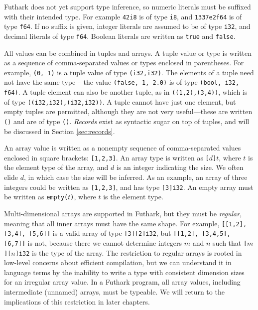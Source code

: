 \documentclass[oneside,11pt]{book}
\begin{document}
Futhark does not yet support type inference, so numeric literals must
be suffixed with their intended type.  For example \texttt{42i8} is of
type \texttt{i8}, and \texttt{1337e2f64} is of type \texttt{f64}.  If
no suffix is given, integer literals are assumed to be of type
\texttt{i32}, and decimal literals of type \texttt{f64}.  Boolean
literals are written as \texttt{true} and \texttt{false}.

All values can be combined in tuples and arrays.  A tuple value or
type is written as a sequence of comma-separated values or types
enclosed in parentheses.  For example, \texttt{(0, 1)} is a tuple
value of type \texttt{(i32,i32)}.  The elements of a tuple need not
have the same type -- the value \texttt{(false, 1, 2.0)} is of type
\texttt{(bool, i32, f64)}.  A tuple element can also be another tuple,
as in \texttt{((1,2),(3,4))}, which is of type
\texttt{((i32,i32),(i32,i32))}.  A tuple cannot have just one element,
but empty tuples are permitted, although they are not very
useful---these are written \texttt{()} and are of type \texttt{()}.
\textit{Records} exist as syntactic sugar on top of tuples, and will
be discussed in Section \ref{sec:records}.

An array value is written as a nonempty sequence of comma-separated
values enclosed in square brackets: \texttt{[1,2,3]}.  An array type
is written as \texttt{[$d$]$t$}, where \texttt{$t$} is the element
type of the array, and $d$ is an integer indicating the size.  We
often elide $d$, in which case the size will be inferred.  As an
example, an array of three integers could be written as
\texttt{[1,2,3]}, and has type \texttt{[3]i32}.  An empty array must be
written as \texttt{empty($t$)}, where \texttt{$t$} is the element
type.

Multi-dimensional arrays are supported in Futhark, but they must be
\textit{regular}, meaning that all inner arrays must have the same
shape.  For example, \texttt{[[1,2], [3,4], [5,6]]} is a valid array
of type \texttt{[3][2]i32}, but \texttt{[[1,2], [3,4,5], [6,7]]} is
not, because there we cannot determine integers $m$ and $n$ such that
\texttt{[$m$][$n$]i32} is the type of the array.  The restriction to
regular arrays is rooted in low-level concerns about efficient
compilation, but we can understand it in language terms by the
inability to write a type with consistent dimension sizes for an
irregular array value.  In a Futhark program, all array values,
including intermediate (unnamed) arrays, must be typeable.  We will
return to the implications of this restriction in later chapters.
\end{document}
